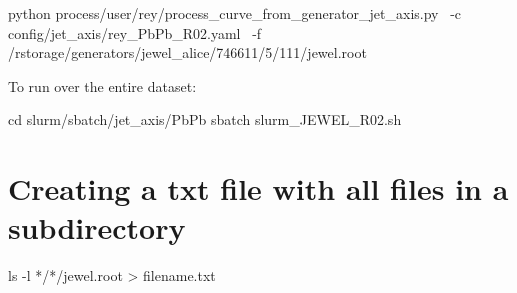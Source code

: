 \documentclass[12pt]{article}
\begin{document}
\begin{tcolorbox}
\begin{verbnobox}[\scriptsize]
python process/user/rey/process_curve_from_generator_jet_axis.py \
-c config/jet_axis/rey_PbPb_R02.yaml \
-f /rstorage/generators/jewel_alice/746611/5/111/jewel.root
\end{verbnobox}  
\end{tcolorbox}

To run over the entire dataset:
\begin{tcolorbox}
\begin{verbnobox}[\scriptsize]
cd slurm/sbatch/jet_axis/PbPb
sbatch slurm_JEWEL_R02.sh
\end{verbnobox}  
\end{tcolorbox}

\section{Creating a txt file with all files in a subdirectory}

\begin{tcolorbox}
\begin{verbnobox}[\scriptsize]
ls -l */*/jewel.root > filename.txt
\end{verbnobox}  
\end{tcolorbox}





\end{document}
